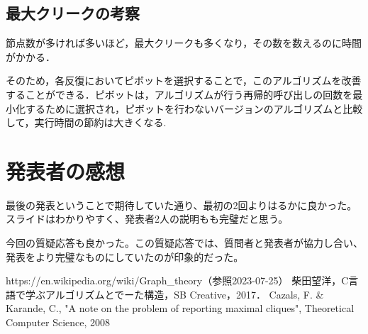 \documentclass[a4j, titlepage]{jarticle}
\begin{document}
    \subsection{最大クリークの考察}
    節点数が多ければ多いほど，最大クリークも多くなり，その数を数えるのに時間がかかる．
    
    そのため，各反復においてピボットを選択することで，このアルゴリズムを改善することができる．ピボットは，アルゴリズムが行う再帰的呼び出しの回数を最小化するために選択され，ピボットを行わないバージョンのアルゴリズムと比較して，実行時間の節約は大きくなる\cite{bib:cazals}. %

\section{発表者の感想}
    最後の発表ということで期待していた通り、最初の2回よりはるかに良かった。スライドはわかりやすく、発表者2人の説明もも完璧だと思う。

    今回の質疑応答も良かった。この質疑応答では、質問者と発表者が協力し合い、発表をより完璧なものにしていたのが印象的だった。

    \begin{thebibliography}{99}
        https://en.wikipedia.org/wiki/Graph\_theory（参照2023-07-25）
        柴田望洋，C言語で学ぶアルゴリズムとでーた構造，SB Creative，2017．
        Cazals, F. \& Karande, C., "A note on the problem of reporting maximal cliques", Theoretical Computer Science, 2008
      \end{thebibliography}
    
\end{document}
